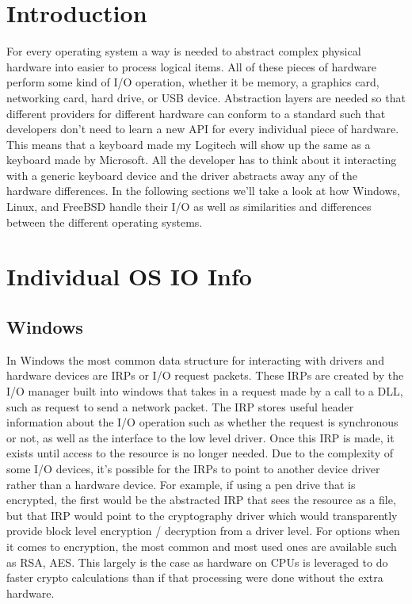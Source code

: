 \section{Introduction}
For every operating system a way is needed to abstract complex physical hardware  into easier to process logical items. All of these pieces of hardware perform some kind of I/O operation, whether it be memory, a graphics card, networking card, hard drive, or USB device. Abstraction layers are needed so that different providers for different hardware can conform to a standard such that developers don't need to learn a new API for every individual piece of hardware. This means that a keyboard made my Logitech will show up the same as a keyboard made by Microsoft. All the developer has to think about it interacting with a generic keyboard device and the driver abstracts away any of the hardware differences. In the following sections we'll take a look at how Windows, Linux, and FreeBSD handle their I/O as well as similarities and differences between the different operating systems. 

\section{Individual OS IO Info}
\subsection{Windows}
In Windows the most common data structure for interacting with drivers and hardware devices are IRPs or I/O request packets. These IRPs are created by the I/O manager built into windows that takes in a request made by a call to a DLL, such as request to send a network packet. The IRP stores useful header information about the I/O operation such as whether the request is synchronous or not, as well as the interface to the low level driver. Once this IRP is made, it exists until access to the resource is no longer needed. Due to the complexity of some I/O devices, it's possible for the IRPs to point to another device driver rather than a hardware device. For example, if using a pen drive that is encrypted, the first would be the abstracted IRP that sees the resource as a file, but that IRP would point to the cryptography driver which would transparently provide block level encryption / decryption from a driver level. For options when it comes to encryption, the most common and most used ones are available such as RSA, AES. This largely is the case as hardware on CPUs is leveraged to do faster crypto calculations than if that processing were done without the extra hardware.

